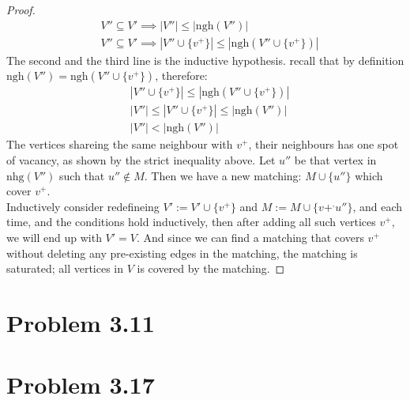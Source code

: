 \documentclass[]{article}
\theoremstyle{definition}
\begin{document}
\begin{proof}
\begin{align}
            & V''\subseteq V' \implies 
            |V''|\le |\text{ngh}(V'')|
            \\
            & V''\subseteq V' \implies 
            |V''\cup\{v^+\}|\le |\text{ngh}(V''\cup\{v^+\})|
        \end{align}
        The second and the third line is the inductive hypothesis. recall that by definition $\text{ngh}(V'') = \text{ngh}(V''\cup \{v^+\})$, therefore: 
        \begin{align}
            & |V''\cup\{v^+\}|\le |\text{ngh}(V''\cup\{v^+\})|
            \\
            & |V''| \le |V''\cup\{v^+\}|\le |\text{ngh}(V'')|
            \\
            & |V''| < |\text{ngh}(V'')|
        \end{align}
        The vertices shareing the same neighbour with $v^+$, their neighbours has one spot of vacancy, as shown by the strict inequality above. Let $u''$ be that vertex in $\text{nhg}(V'')$ such that $u''\not\in M$. Then we have a new matching: $M\cup \{u''\}$ which cover $v^+$. 
        \\[1.1em]
        Inductively consider redefineing $V':= V'\cup \{v^+\}$ and $M:= M\cup \{v+^,u''\}$, and each time, and the conditions hold inductively, then after adding all such vertices $v^+$, we will end up with $V' = V$. And since we can find a matching that covers $v^+$ without deleting any pre-existing edges in the matching, the matching is saturated; all vertices in $V$ is covered by the matching. 
    \end{proof}
\section{Problem 3.11}
    
\section{Problem 3.17}
\end{document}
